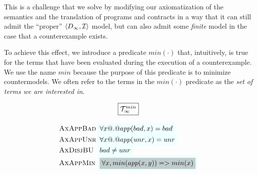 This is a challenge that we solve by modifying our axiomatization of the semantics 
and the translation of programs and contracts in a way that it can still admit 
the ``proper'' $\langle D_\infty,{\cal I}\rangle$ model, but can also admit 
some {\em finite} model in the case that a counterexample exists. 

To achieve this effect, we introduce a predicate $min(\cdot)$ that, intuitively, is true
for the terms that have been evaluated during the execution of a counterexample. We use 
the name $min$ because the purpose of this predicate is to minimize countermodels. We often 
refer to the terms in the $min(\cdot)$ predicate as the {\em set of terms we are interested in}.

\begin{figure} 
{\small
\[\setlength{\arraycolsep}{1pt}
\begin{array}{c}
\ruleform{\ThMin} \\ \\ 
\begin{array}{lll}
 \textsc{AxAppBad}  & \formula{\forall x @.@ app(\bad,x) = \bad} \\
 \textsc{AxAppUnr}  & \formula{\forall x @.@ app(\unr,x) = \unr} \\ 
 \textsc{AxDisjBU} & \formula{\bad \neq \unr} \\
 \textsc{AxAppMin}& \formula{\highlight{\forall x, min(app(x,y)) => min(x)}} \\ \\


\end{array}
\end{array}\]}
\end{figure}
